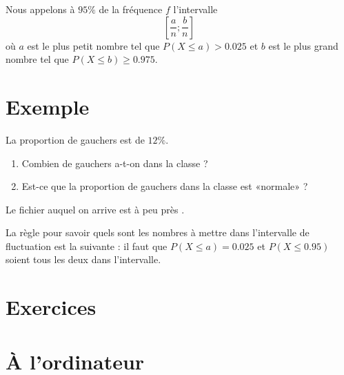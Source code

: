 Nous appelons  à \( 95\%\) de la fréquence \( f\) l'intervalle 
\begin{equation}
    \left[ \frac{ a }{ n };\frac{ b }{ n } \right]
\end{equation}
où \(  a\) est le plus petit nombre tel que \( P(X\leq a)>0.025\) et \( b\) est le plus grand nombre tel que \( P(X\leq b)\geq 0.975\).

\section{Exemple}

La proportion de gauchers est de \( 12\%\).
\begin{enumerate}
    \item
        Combien de gauchers a-t-on dans la classe ?
    \item
        Est-ce que la proportion de gauchers dans la classe est «normale» ?
\end{enumerate}
Le fichier auquel on arrive est à peu près .

\begin{Aretenir}
    La règle pour savoir quels sont les nombres à mettre dans l'intervalle de fluctuation est la suivante : il faut que \( P(X\leq a)=0.025\) et \( P(X\leq 0.95)\) soient tous les deux dans l'intervalle.
\end{Aretenir}

\section{Exercices}


\section{À l'ordinateur}

